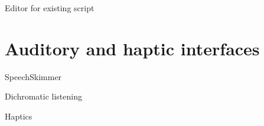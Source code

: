 Editor for existing script \citep{Shin2016}


\section{Auditory and haptic interfaces}\label{sec:auditory}

SpeechSkimmer \citep{Arons1997}

Dichromatic listening \citep{Ranjan2006}

Haptics
\citep{Metatla2016}






